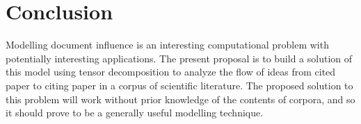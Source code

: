 \documentclass{article}
\begin{document}
\section{Conclusion}
Modelling document influence is an interesting computational problem
with potentially interesting applications.  The present proposal is to
build a solution of this model using tensor decomposition to analyze
the flow of ideas from cited paper to citing paper in a corpus of
scientific literature.  The proposed solution to this problem will
work without prior knowledge of the contents of corpora, and so it
should prove to be a generally useful modelling technique.


{}

\end{document}
